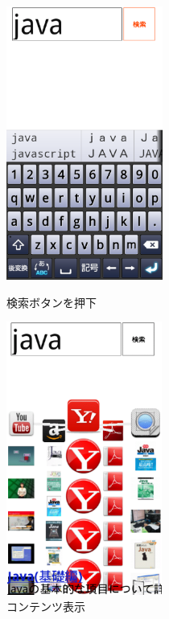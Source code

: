 \begin{figure}[htbp]
 \begin{minipage}{0.45\hsize}
  \begin{center}
   \includegraphics[height=90mm]{eps/le03.eps}
  \end{center}
  \caption{検索ボタンを押下}
  \label{le03}
 \end{minipage}
 \begin{minipage}{0.45\hsize}
  \begin{center}
   \includegraphics[height=90mm]{eps/le04.eps}
  \end{center}
  \caption{コンテンツ表示}
  \label{le04}
 \end{minipage}
\end{figure}


